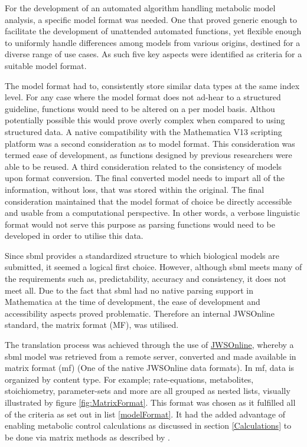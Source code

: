 For the development of an automated algorithm handling metabolic model analysis, a specific model format was needed. One that proved generic enough to facilitate the development of unattended automated functions, yet flexible enough to uniformly handle differences among models from various origins, destined for a diverse range of use cases. As such five key aspects were identified as criteria for a suitable model format.

The model format had to, consistently store similar data types at the same index level. For any case where the model format does not ad-hear to a structured guideline, functions would need to be altered on a per model basis. Althou potentially possible this would prove overly complex when compared to using structured data. A native compatibility with the Mathematica V13 scripting platform was a second consideration as to model format. This consideration was termed ease of development, as functions designed by previous researchers were able to be reused. A third consideration related to the consistency of models upon format conversion. The final converted model needs to impart all of the information, without loss, that was stored within the original. The final consideration maintained that the model format of choice be directly accessible and usable from a computational perspective. In other words, a verbose linguistic format would not serve this purpose as parsing functions would need to be developed in order to utilise this data.

Since \gls{sbml} provides a standardized structure to which biological models are submitted, it seemed a logical first choice. However, although \gls{sbml} meets many of the requirements such as, predictability, accuracy and consistency, it does not meet all. Due to the fact that \gls{sbml} had no native parsing support in Mathematica at the time of development, the ease of development and accessibility aspects proved problematic. Therefore an internal JWSOnline standard, the matrix format (MF), was utilised. 

The translation process was achieved through the use of \href{https://jjj.bio.vu.nl}{JWSOnline}, whereby a \gls{sbml} model was retrieved from a remote server, converted and made available in matrix format (\gls{mf}) (One of the native JWSOnline data formats). In \gls{mf}, data is organized by content type. For example; rate-equations, metabolites, stoichiometry, parameter-sets and more are all grouped as nested lists, visually illustrated by figure \ref{fig:MatrixFormat}.  This format was chosen as it fulfilled all of the criteria as set out in list \ref{modelFormat}. It had the added advantage of enabling metabolic control calculations as discussed in section \ref{Calculations} to be done via matrix methods as described by \citeauthor{Hofmeyr2001}.

